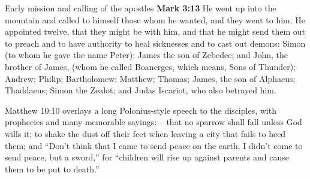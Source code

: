 \documentclass[10pt,twoside]{article} %
\newcommand{\quotesize}{\normalsize{}}
\newcommand{\comm}[1]{\begingroup \color{black!50} #1\endgroup}
\newenvironment{quotetext}{\begingroup\quotesize}{\endgroup}
\newcommand{\bible}[2]{\begin{quotetext}\textbf{#1} #2\end{quotetext}}
\newcommand{\gospelmark}[2]{\bible{Mark #1}{#2}}
\begin{document}
\begin{section}{Early mission and calling of the apostles}
\gospelmark{3:13}{
  He went up into the mountain and called to himself those whom he wanted, and they went to him.   He appointed twelve, that they might be with him, and that he might send them out to preach   and to have authority to heal sicknesses and to cast out demons:   Simon (to whom he gave the name Peter);   James the son of Zebedee; and John, the brother of James, (whom he called Boanerges, which means, Sons of Thunder);   Andrew; Philip; Bartholomew; Matthew; Thomas; James, the son of Alphaeus; Thaddaeus; Simon the Zealot;   and Judas Iscariot, who also betrayed him. 
}

\comm{
Matthew 10:10 overlays a long Polonius-style speech to the disciples, with prophecies and many memorable sayings: --
that no sparrow shall fall unless God wills it; to shake the dust off their feet when leaving a city that fails
to heed them; and
``Don't think that I came to send peace on the earth. I didn't come to send peace, but a sword,''
for ``children will rise up against parents and cause them to be put to death.''
}

\end{section}
\end{document}
